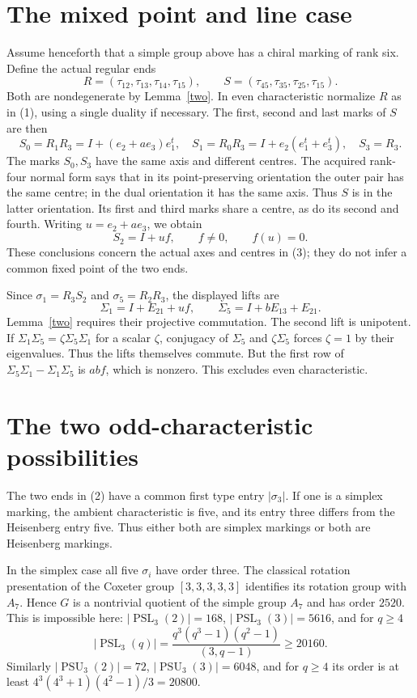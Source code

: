 \documentclass[11pt]{article}
\newcommand{\PSL}{\operatorname{PSL}}\newcommand{\PSU}{\operatorname{PSU}}
\begin{document}
\section*{The mixed point and line case}
Assume henceforth that a simple group above has a chiral marking of
rank six. Define the actual regular ends
\[
 R=(\tau_{12},\tau_{13},\tau_{14},\tau_{15}),\qquad
 S=(\tau_{45},\tau_{35},\tau_{25},\tau_{15}).             \tag{2}
\]
Both are nondegenerate by Lemma~\ref{two}. In even characteristic
normalize $R$ as in (1), using a single duality if necessary.
The first, second and last marks of $S$ are then
\[
 S_0=R_1R_3=I+(e_2+a e_3)e_1^t,\quad
 S_1=R_0R_3=I+e_2(e_1^t+e_3^t),\quad S_3=R_3.          \tag{3}
\]
The marks $S_0,S_3$ have the same axis and different centres.
The acquired rank-four normal form says that in its point-preserving
orientation the outer pair has the same centre; in the dual orientation
it has the same axis. Thus $S$ is in the latter orientation.
Its first and third marks share a centre, as do its second and fourth.
Writing $u=e_2+a e_3$, we obtain
\[
 S_2=I+u f,\qquad f\ne0,\qquad f(u)=0.                 \tag{4}
\]
These conclusions concern the actual axes and centres in (3); they do
not infer a common fixed point of the two ends.

Since $\sigma_1=R_3S_2$ and $\sigma_5=R_2R_3$, the displayed lifts are
\[
 \Sigma_1=I+E_{21}+u f,\qquad
 \Sigma_5=I+bE_{13}+E_{21}.                            \tag{5}
\]
Lemma~\ref{two} requires their projective commutation. The second lift
is unipotent. If $\Sigma_1\Sigma_5=\zeta\Sigma_5\Sigma_1$ for a
scalar $\zeta$, conjugacy of $\Sigma_5$ and $\zeta\Sigma_5$ forces
$\zeta=1$ by their eigenvalues. Thus the lifts themselves commute.
But the first row of $\Sigma_5\Sigma_1-\Sigma_1\Sigma_5$ is $abf$,
which is nonzero. This excludes even characteristic.

\section*{The two odd-characteristic possibilities}
The two ends in (2) have a common first type entry $|\sigma_3|$.
If one is a simplex marking, the ambient characteristic is five, and
its entry three differs from the Heisenberg entry five. Thus either
both are simplex markings or both are Heisenberg markings.

In the simplex case all five $\sigma_i$ have order three. The classical
rotation presentation of the Coxeter group $[3,3,3,3,3]$ identifies its
rotation group with $A_7$. Hence $G$ is a nontrivial quotient of the
simple group $A_7$ and has order $2520$. This is impossible here:
$|\PSL_3(2)|=168$, $|\PSL_3(3)|=5616$, and for $q\ge4$
\[
 |\PSL_3(q)|=\frac{q^3(q^3-1)(q^2-1)}{(3,q-1)}\ge20160.
\]
Similarly $|\PSU_3(2)|=72$, $|\PSU_3(3)|=6048$, and for $q\ge4$
its order is at least $4^3(4^3+1)(4^2-1)/3=20800$.
\end{document}
